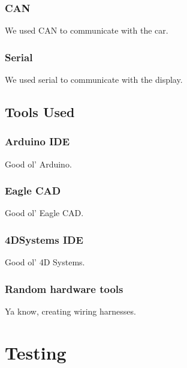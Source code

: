 \documentclass[12pt]{article} %
\begin{document}
\begin{flushleft}
\subsubsection{CAN} %

We used CAN to communicate with the car.

\subsubsection{Serial} %

We used serial to communicate with the display.


\subsection{Tools Used} %

\subsubsection{Arduino IDE} %

Good ol' Arduino.

\subsubsection{Eagle CAD} %

Good ol' Eagle CAD.

\subsubsection{4DSystems IDE} %

Good ol' 4D Systems.

\subsubsection{Random hardware tools} %

Ya know, creating wiring harnesses.




\section{Testing}


\end{flushleft}
\end{document}
